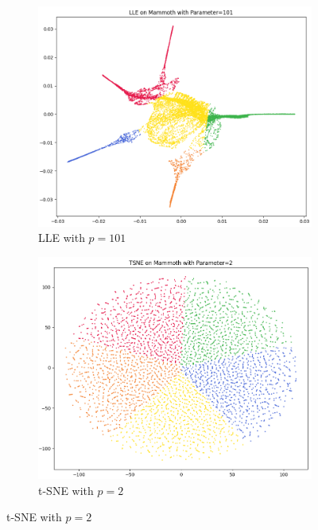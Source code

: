 \begin{figure}[!]
     \centering
     \begin{subfigure}[t]{0.49\columnwidth}
    	\centering
    	\includegraphics[width=\columnwidth]{images/KMEANS_5_LLE_101.png}
    	\caption{LLE with $p=101$}
        \label{fig:KMEANS_5_LLE_101}
    \end{subfigure}
     \hfill
     \begin{subfigure}[t]{0.49\columnwidth}
    	\centering
    	\includegraphics[width=\columnwidth]{images/KMEANS_5_TSNE_2.png}
    	\caption{t-SNE with $p=2$}
        \label{fig:KMEANS_5_TSNE_2}

\end{subfigure}
\end{figure}
